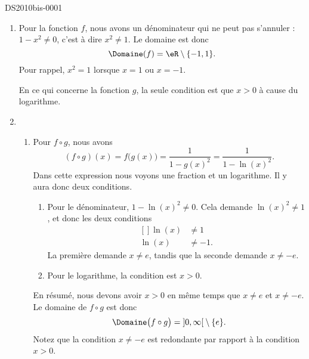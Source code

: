 
\begin{corrige}{DS2010bis-0001}

	\begin{enumerate}
		\item
			Pour la fonction  $f$, nous avons un dénominateur qui ne peut pas s'annuler : $1-x^2\neq 0$, c'est à dire $x^2\neq 1$. Le domaine est donc 
			\begin{equation}
				\Domaine(f)=\eR\setminus\{ -1,1 \}.
			\end{equation}
			Pour rappel, $x^2=1$ lorsque $x=1$ ou $x=-1$.

			En ce qui concerne la fonction $g$, la seule condition est que $x>0$ à cause du logarithme.
		\item
			\begin{enumerate}
				\item
					Pour $f\circ g$, nous avons
					\begin{equation}
						(f\circ g)(x)=f\big( g(x) \big)=\frac{1}{ 1-g(x)^2 }=\frac{1}{ 1-\ln(x)^2 }.
					\end{equation}
					Dans cette expression nous voyons une fraction et un logarithme. Il y aura donc deux conditions.
					\begin{enumerate}
						\item
							Pour le dénominateur, $1-\ln(x)^2\neq 0$. Cela demande $\ln(x)^2\neq 1$, et donc les deux conditions
							\begin{equation}
								\begin{aligned}[]
									\ln(x)&\neq 1\\
									\ln(x)&\neq -1.
								\end{aligned}
							\end{equation}
							La première demande $x\neq e$, tandis que la seconde demande $x\neq -e$.
						\item
							Pour le logarithme, la condition est $x>0$.
					\end{enumerate}
					En résumé, nous devons avoir $x>0$ en même temps que $x\neq e$ et $x\neq -e$. Le domaine de $f\circ g$ est donc
					\begin{equation}
						\Domaine\big( f\circ g \big)=\mathopen] 0 , \infty \mathclose[\setminus\{ e \}.
					\end{equation}
					Notez que la condition $x\neq -e$ est redondante par rapport à la condition $x>0$.


\end{enumerate}
\end{enumerate}
\end{corrige}
